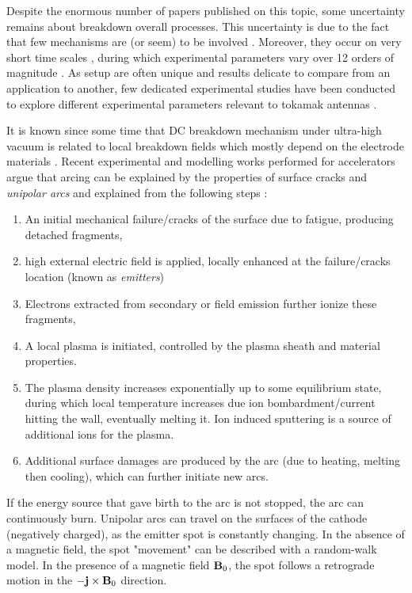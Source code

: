 Despite the enormous number of papers published on this topic, some uncertainty remains about breakdown overall processes. This uncertainty is due to the fact that few mechanisms are (or seem) to be involved . Moreover, they occur on very short time scales , during which experimental parameters vary over 12 orders of magnitude . As setup are often unique and results delicate to compare from an application to another, few dedicated experimental studies have been conducted to explore different  experimental parameters relevant to tokamak antennas .

It is known since some time that DC breakdown mechanism under ultra-high vacuum is related to local breakdown fields which mostly depend on the electrode materials . Recent experimental and modelling works performed for accelerators argue that arcing can be explained by the properties of surface cracks and \textit{unipolar arcs} and explained from the following steps :
\begin{enumerate}
\item An initial mechanical failure/cracks of the surface due to fatigue, producing detached fragments,
\item high external electric field is applied, locally enhanced at the failure/cracks location (known as \textit{emitters})
\item Electrons extracted from secondary or field emission further ionize these fragments,
\item A local plasma is initiated, controlled by the plasma sheath and material properties. 
\item The plasma density increases exponentially up to some equilibrium state, during which local temperature increases due ion bombardment/current hitting the wall, eventually melting it. Ion induced sputtering is a source of additional ions for the plasma.
\item Additional surface damages are produced by the arc (due to heating, melting then cooling), which can further initiate new arcs.
\end{enumerate}
If the energy source that gave birth to the arc is not stopped, the arc can continuously burn. Unipolar arcs can travel on the surfaces of the cathode (negatively charged), as the emitter spot is constantly changing. In the absence of a magnetic field, the spot "movement" can be described with a random-walk model. In the presence of a magnetic field ${\mathbf B}_0$, the spot follows a retrograde motion in the $-{\mathbf j}\times{\mathbf B}_0$ direction. 


